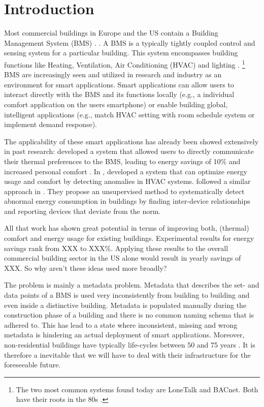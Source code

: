 \section{Introduction} %
Most commercial buildings in Europe and the US contain a Building Management System (BMS) \cite{Efficiency:2011aa}. .
A BMS is a typically tightly coupled control and sensing system for a particular building. This system encompasses building functions like Heating, Ventilation, Air Conditioning (HVAC) and lighting \cite{salsbury2005survey}. \footnote{The two most common systems found today are LoneTalk and BACnet. Both have their roots in the 80s \cite{fisher2000bacnet}.}
BMS are increasingly seen and utilized in research and industry as an environment for smart applications.
Smart applications can allow users to interact directly with the BMS and its functions locally (e.g., a individual comfort application on the users smartphone) or enable building global, intelligent applications (e.g., match HVAC setting with room schedule system or implement demand response).

The applicability of these smart applications has already been showed extensively in past research:
\citeauthor{Erickson2012} developed a system that allowed users to directly communicate their thermal preferences to the BMS, leading to energy savings of 10\% and increased personal comfort \cite{Erickson2012}. In \cite{narayanaswamy2014data}, \citeauthor{narayanaswamy2014data} developed a system that can optimize energy usage and comfort by detecting anomalies in HVAC systems. \citeauthor{Fontugne2013} followed a similar approach in \cite{Fontugne2013}. They propose an unsupervised method to systematically detect abnormal energy consumption in buildings by finding inter-device relationships and reporting devices that deviate from the norm.

All that work has shown great potential in terms of improving both, (thermal) comfort and energy usage for existing buildings.
Experimental results for energy savings rank from XXX to XXX\%.
Applying these results to the overall commercial building sector in the US alone would result in yearly savings of XXX.
So why aren't these ideas used more broadly?

The problem is mainly a metadata problem. Metadata that describes the set- and data points of a BMS is used very inconsistently from building to building and even inside a distinctive building. Metadata is populated manually during the construction phase of a building and there is no common naming schema that is adhered to.
This has lead to a state where inconsistent, missing and wrong metadata is hindering an actual deployment of smart applications.
Moreover, non-residential buildings have typically life-cycles between 50 and 75 years \cite{khasreen2009life}.
It is therefore a inevitable that we will have to deal with their infrastructure for the foreseeable future.

